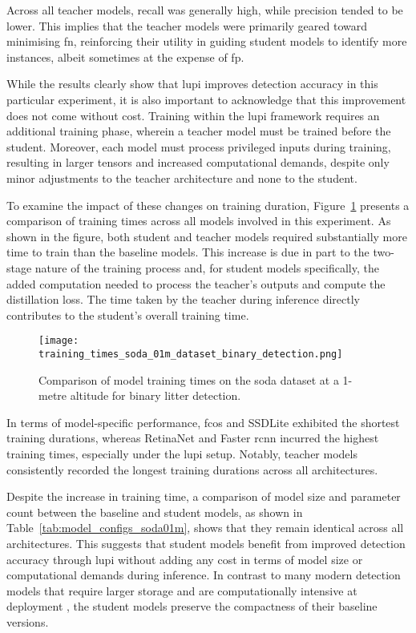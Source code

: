 Across all teacher models, recall was generally high, while precision tended to be lower. This implies that the teacher models were primarily geared toward minimising \gls{fn}, reinforcing their utility in guiding student models to identify more instances, albeit sometimes at the expense of \gls{fp}.

While the results clearly show that \gls{lupi} improves detection accuracy in this particular experiment, it is also important to acknowledge that this improvement does not come without cost. Training within the \gls{lupi} framework requires an additional training phase, wherein a teacher model must be trained before the student. Moreover, each model must process privileged inputs during training, resulting in larger tensors and increased computational demands, despite only minor adjustments to the teacher architecture and none to the student.

To examine the impact of these changes on training duration, Figure~\ref{fig:soda01m_training_time} presents a comparison of training times across all models involved in this experiment. As shown in the figure, both student and teacher models required substantially more time to train than the baseline models. This increase is due in part to the two-stage nature of the training process and, for student models specifically, the added computation needed to process the teacher’s outputs and compute the distillation loss. The time taken by the teacher during inference directly contributes to the student’s overall training time.

\begin{figure}[!ht]
    \centering
    \texttt{[image: training\_times\_soda\_01m\_dataset\_binary\_detection.png]}
    \caption{Comparison of model training times on the \gls{soda} dataset at a 1-metre altitude for binary litter detection.}
    \label{fig:soda01m_training_time}
\end{figure}

In terms of model-specific performance, \gls{fcos} and SSDLite exhibited the shortest training durations, whereas RetinaNet and Faster \gls{rcnn} incurred the highest training times, especially under the \gls{lupi} setup. Notably, teacher models consistently recorded the longest training durations across all architectures.

Despite the increase in training time, a comparison of model size and parameter count between the baseline and student models, as shown in Table~\ref{tab:model_configs_soda01m}, shows that they remain identical across all architectures. This suggests that student models benefit from improved detection accuracy through \gls{lupi} without adding any cost in terms of model size or computational demands during inference. In contrast to many modern detection models that require larger storage and are computationally intensive at deployment \cite{detr, rt-detr, rt-detrv2, rf-detr}, the student models preserve the compactness of their baseline versions.

